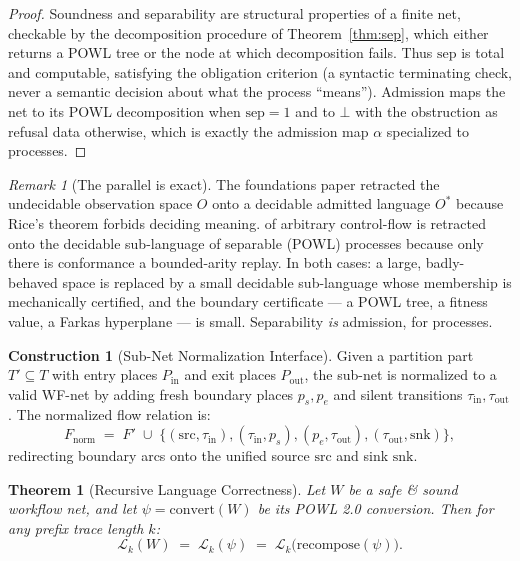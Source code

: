 \documentclass[11pt,oneside]{book}
\theoremstyle{definition}
\newtheorem{construction}{Construction}[chapter]
\theoremstyle{plain}
\newtheorem{theorem}{Theorem}[chapter]
\theoremstyle{remark}
\newtheorem*{remark}{Remark}
\newcommand{\adm}{\alpha}                      %
\newcommand{\Rfsl}{\bot}                        %
\begin{document}
\begin{proof}
Soundness and separability are structural properties of a finite net, checkable by the
decomposition procedure of Theorem~\ref{thm:sep}, which either returns a POWL tree or the node
at which decomposition fails. Thus $\text{sep}$ is total and computable, satisfying the
obligation criterion (a syntactic terminating check, never a semantic decision about what the
process ``means''). Admission maps the net to its POWL decomposition when $\text{sep}=1$ and to
$\Rfsl$ with the obstruction as refusal data otherwise, which is exactly the admission map
$\adm$ specialized to processes. \end{proof}

\begin{remark}[The parallel is exact]
The foundations paper retracted the undecidable observation space $O$ onto a decidable
admitted language $O^*$ because Rice's theorem forbids deciding meaning.%
of arbitrary control-flow is retracted onto the decidable sub-language of separable (POWL)
processes because only there is conformance a bounded-arity replay. In both cases: a large,
badly-behaved space is replaced by a small decidable sub-language whose membership is
mechanically certified, and the boundary certificate --- a POWL tree, a fitness value, a Farkas
hyperplane --- is small. Separability \emph{is} admission, for processes.
\end{remark}

\begin{construction}[Sub-Net Normalization Interface]\label{con:normalize}
Given a partition part $T'\subseteq T$ with entry places $P_{\text{in}}$ and exit places $P_{\text{out}}$, the sub-net is normalized to a valid WF-net by adding fresh boundary places $p_s, p_e$ and silent transitions $\tau_{\text{in}}, \tau_{\text{out}}$. The normalized flow relation is:
\begin{equation}\label{eq:normalize}
F_{\text{norm}}\;=\;F' \;\cup\; \{ (\text{src}, \tau_{\text{in}}), (\tau_{\text{in}}, p_s), (p_e, \tau_{\text{out}}), (\tau_{\text{out}}, \text{snk}) \},
\end{equation}
redirecting boundary arcs onto the unified source $\text{src}$ and sink $\text{snk}$.
\end{construction}

\begin{theorem}[Recursive Language Correctness]\label{thm:lang-correct}
Let $W$ be a safe \& sound workflow net, and let $\psi = \text{convert}(W)$ be its POWL 2.0 conversion.%
Then for any prefix trace length $k$:%
\[
\mathcal{L}_k(W) \;=\; \mathcal{L}_k(\psi) \;=\; \mathcal{L}_k\bigl(\text{recompose}(\psi)\bigr).%
\]
\end{theorem}
\end{document}
